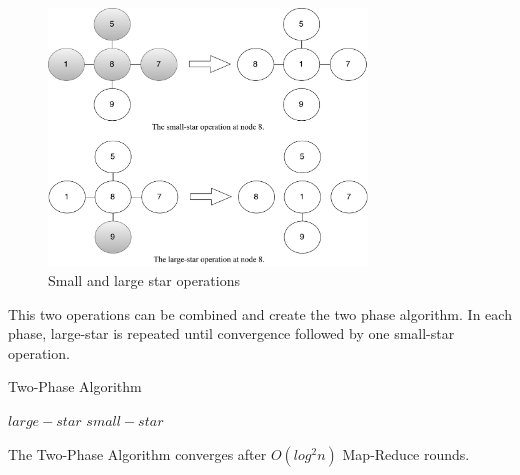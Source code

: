 \begin{figure}[ht]
  \centering
    \includegraphics[width=20pc]{figures/two_phase}
  \caption{Small and large star operations}
  \label{fig:smalllargestar}
\end{figure}

This two operations can be combined and create the two phase algorithm. In each phase, large-star is repeated until convergence followed by one small-star operation.

\begin{algorithm}[!h]
        \caption{Two-Phase Algorithm}
        \label{algo:two_phase}
        \begin{algorithmic}[1]
                        \Repeat
                                \Repeat
                                        \State $large-star$
                        \State $small-star$
                \EndFunction
        \end{algorithmic}
\end{algorithm}

The Two-Phase Algorithm converges after $O(log^2 n)$ Map-Reduce rounds.
